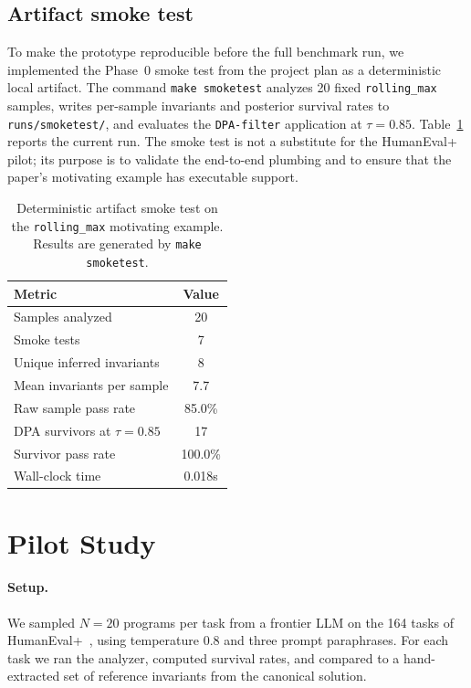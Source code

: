 \documentclass[sigconf,review,anonymous,nonacm]{acmart}
\begin{document}
\subsection{Artifact smoke test}
To make the prototype reproducible before the full benchmark run, we
implemented the Phase~0 smoke test from the project plan as a deterministic
local artifact. The command \texttt{make smoketest} analyzes 20 fixed
\texttt{rolling\_max} samples, writes per-sample invariants and posterior
survival rates to \texttt{runs/smoketest/}, and evaluates the
\texttt{DPA-filter} application at $\tau=0.85$. Table~\ref{tab:smoketest}
reports the current run. The smoke test is not a substitute for the
HumanEval+ pilot; its purpose is to validate the end-to-end plumbing and
to ensure that the paper's motivating example has executable support.

\begin{table}[t]
\centering
\caption{Deterministic artifact smoke test on the \texttt{rolling\_max}
motivating example. Results are generated by \texttt{make smoketest}.}
\label{tab:smoketest}
\begin{tabular}{@{}lc@{}}
\toprule
Metric & Value \\
\midrule
Samples analyzed & 20 \\
Smoke tests & 7 \\
Unique inferred invariants & 8 \\
Mean invariants per sample & 7.7 \\
Raw sample pass rate & 85.0\% \\
DPA survivors at $\tau=0.85$ & 17 \\
Survivor pass rate & 100.0\% \\
Wall-clock time & 0.018s \\
\bottomrule
\end{tabular}
\end{table}

\section{Pilot Study}
\label{sec:pilot}

\paragraph{Setup.} We sampled $N=20$ programs per task from a frontier
LLM on the 164 tasks of HumanEval+~\cite{liu2023humanevalplus}, using
temperature 0.8 and three prompt paraphrases. For each task we ran the
analyzer, computed survival rates, and compared to a hand-extracted set
of reference invariants from the canonical solution.
\end{document}
